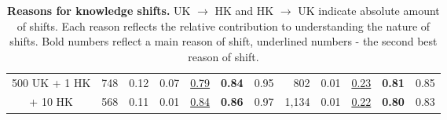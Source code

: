 \begin{table*}[!ht]
{\begin{tabular}{c|rccccc|rcccc}
500 UK + \hspace{0.5ex} 1 HK  & 748                                              & 0.12                                                                       & 0.07                                                                        & \underline{0.79}                                                                & \textbf{0.84}                                                              & 0.95                                                                           & 802                                              & 0.01                                                                        & \underline{0.23}                                                                & \textbf{0.81}                                                              & 0.85                                                                          \\
\hspace{7ex} + 10 HK & 568                                              & 0.11                                                                       & 0.01                                        & \underline{0.84}                                                                & \textbf{0.86}                                                              & 0.97                                                                           & 1,134                                             & 0.01                                                                        & \underline{0.22}                                                                & \textbf{0.80}                                                              & 0.83                                                                          \\ \bottomrule
\end{tabular}
}
\caption{\textbf{Reasons for knowledge shifts.} UK $\to$ HK and HK $\to$ UK indicate absolute amount of shifts. Each reason reflects the relative contribution to understanding the nature of shifts. Bold numbers reflect a main reason of shift, underlined numbers - the second best reason of shift.  } 

\label{shifts_explained}
\end{table*}
